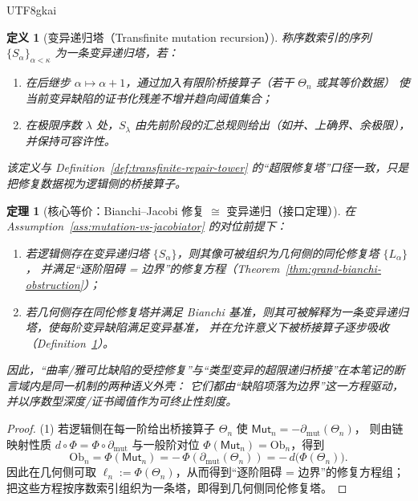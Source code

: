 \documentclass[12pt]{article}
\newtheorem{definition}{定义}[section]
\newtheorem{theorem}{定理}[section]
\newcommand{\Layer}{\ensuremath{\ell}}
\newcommand{\Ob}{\mathrm{Ob}}
\begin{document}
\begin{CJK*}{UTF8}{gkai}
\begin{definition}[变异递归塔（Transfinite mutation recursion）]
\label{def:mutation-recursion-tower}
称序数索引的序列 $\{S_\alpha\}_{\alpha<\kappa}$ 为一条\emph{变异递归塔}，若：
\begin{enumerate}
  \item 在后继步 $\alpha\mapsto \alpha+1$，通过加入有限阶桥接算子（若干 $\Theta_n$ 或其等价数据）
        使当前变异缺陷的证书化残差不增并趋向阈值集合；
  \item 在极限序数 $\lambda$ 处，$S_\lambda$ 由先前阶段的汇总规则给出（如并、上确界、余极限），并保持可容许性。
\end{enumerate}
该定义与 Definition~\ref{def:transfinite-repair-tower} 的“超限修复塔”口径一致，只是把修复数据视为逻辑侧的桥接算子。
\end{definition}

\begin{theorem}[核心等价：Bianchi--Jacobi 修复 $\cong$ 变异递归（接口定理）]
\label{thm:bianchi-mutation-equivalence}
在 Assumption~\ref{ass:mutation-vs-jacobiator} 的对位前提下：
\begin{enumerate}
  \item 若逻辑侧存在变异递归塔 $\{S_\alpha\}$，则其像可被组织为几何侧的同伦修复塔 $\{L_\alpha\}$，
        并满足“逐阶阻碍 = 边界”的修复方程（Theorem~\ref{thm:grand-bianchi-obstruction}）；
  \item 若几何侧存在同伦修复塔并满足 Bianchi 基准，则其可被解释为一条变异递归塔，使每阶变异缺陷满足变异基准，
        并在允许意义下被桥接算子逐步吸收（Definition~\ref{def:mutation-recursion-tower}）。
\end{enumerate}
因此，“曲率/雅可比缺陷的受控修复”与“类型变异的超限递归桥接”在本笔记的断言域内是同一机制的两种语义外壳：
它们都由“缺陷项落为边界”这一方程驱动，并以序数型深度/证书阈值作为可终止性刻度。
\end{theorem}

\begin{proof}
(1) 若逻辑侧在每一阶给出桥接算子 $\Theta_n$ 使 $\mathsf{Mut}_n=-\partial_{\mathrm{mut}}(\Theta_n)$，
则由链映射性质 $d\circ\Phi=\Phi\circ\partial_{\mathrm{mut}}$ 与一般阶对位 $\Phi(\mathsf{Mut}_n)=\Ob_n$，得到
\[
  \Ob_n
  =
  \Phi(\mathsf{Mut}_n)
  =
  -\,\Phi(\partial_{\mathrm{mut}}(\Theta_n))
  =
  -\,d\bigl(\Phi(\Theta_n)\bigr).
\]
因此在几何侧可取 $\Layer_n:=\Phi(\Theta_n)$，从而得到“逐阶阻碍 = 边界”的修复方程组；
把这些方程按序数索引组织为一条塔，即得到几何侧同伦修复塔。


\end{proof}
\end{CJK*}
\end{document}
